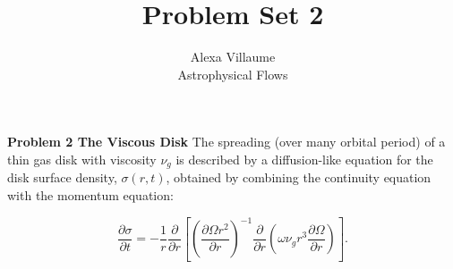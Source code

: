\documentclass[12pt]{article}
\begin{document}
 
 \title{Problem Set 2}
\author{Alexa Villaume\\ 
Astrophysical Flows} 
 
\maketitle

\noindent \textbf{Problem 2 The Viscous Disk} The spreading (over many orbital period) of a thin gas disk with viscosity $\nu_g$ is described by a diffusion-like equation for the disk surface density, $\sigma\left(r,t\right)$, obtained by combining the continuity equation with the momentum equation:

\begin{equation*}
\frac{\partial \sigma}{\partial t} = - \frac{1}{r}\frac{\partial}{\partial r}\left[ \left(\frac{\partial \Omega r^2}{\partial r}\right)^{-1} \frac{\partial}{\partial r}\left( \omega \nu_g r^3 \frac{\partial \Omega}{\partial r}\right)\right].
\end{equation*} 
\end{document}
